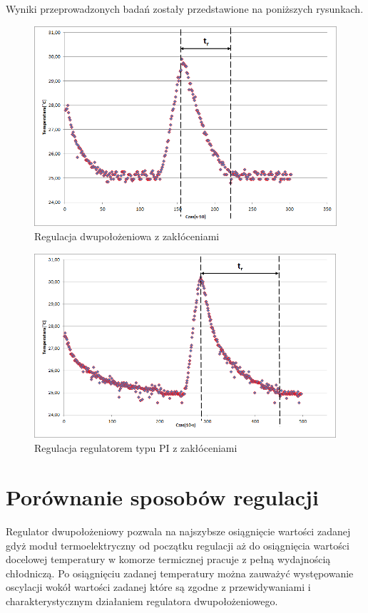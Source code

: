 \documentclass[oneside]{mgr}
\begin{document}
Wyniki przeprowadzonych badań zostały przedstawione na poniższych rysunkach.
\begin{center}
\begin{figure}[h!]
    \centering
    \includegraphics[width=\textwidth]{Dwupolozeniowy_zak.png}
    \caption{Regulacja dwupołożeniowa z zakłóceniami}
    \end{figure}
\end{center}
\begin{center}
\begin{figure}[h!]
    \centering
    \includegraphics[width=\textwidth]{PI_zak.png}
    \caption{Regulacja regulatorem typu PI z zakłóceniami}
    \end{figure}
\end{center}
\newpage

\section{Porównanie sposobów regulacji}
Regulator dwupołożeniowy pozwala na najszybsze osiągnięcie wartości zadanej gdyż moduł termoelektryczny od początku regulacji aż do osiągnięcia wartości docelowej temperatury w komorze termicznej pracuje z pełną wydajnością chłodniczą. Po osiągnięciu zadanej temperatury można zauważyć występowanie oscylacji wokół wartości zadanej które są zgodne z przewidywaniami i charakterystycznym działaniem regulatora dwupołożeniowego.
\end{document}
